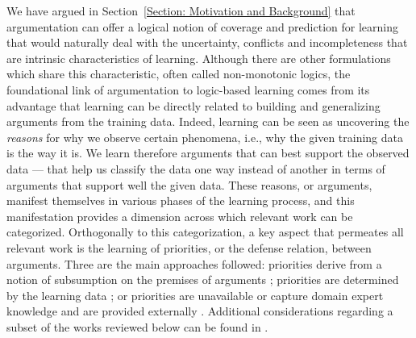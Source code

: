 We have argued in Section~\ref{Section: Motivation and Background} that argumentation can offer a logical notion of coverage and prediction for learning that would naturally deal with the uncertainty, conflicts and incompleteness that are intrinsic characteristics of learning. Although there are other formulations which share this characteristic, often called non-monotonic logics, the foundational link of argumentation to logic-based learning comes from its advantage that learning can be directly related to building and generalizing arguments from the training data. Indeed, learning can be seen as uncovering the \emph{reasons} for why we observe certain phenomena, i.e., why the given training data is the way it is. We learn therefore arguments that can best support the observed data --- that help us classify the data one way instead of another in terms of arguments that support well the given data.
These reasons, or arguments, manifest themselves in various phases of the learning process, and this manifestation provides a dimension across which relevant work can be categorized. Orthogonally to this categorization, a key aspect that permeates all relevant work is the learning of priorities, or the defense relation, between arguments. Three are the main approaches followed:  priorities derive from a notion of subsumption on the premises of arguments ;  priorities are determined by the learning data ; or  priorities are unavailable or capture domain expert knowledge and are provided externally . Additional considerations regarding a subset of the works reviewed below can be found in .

